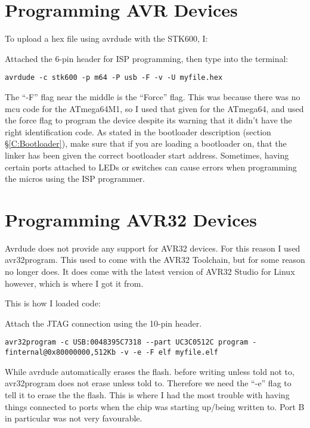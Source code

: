 \documentclass[a4paper, oneside, 11pt, titlepage, onecolumn, openright]{report}
\begin{document}
{{\section{Programming AVR Devices}
			\label{s:STK600AVRDevices}
			To upload a hex file using avrdude with the STK600, I:\newline
			
			Attached the 6-pin header for ISP programming, then type into the terminal:
			
\begin{lstlisting}[frame=trBL, breaklines=true]
 avrdude -c stk600 -p m64 -P usb -F -v -U myfile.hex 
\end{lstlisting}

			The ``-F'' flag near the middle is the ``Force'' flag. This was because there was no mcu code for the ATmega64M1, so I used that given for the ATmega64, and used the force flag to program the device despite its warning that it didn't have the right identification code. \newline
			As stated in the bootloader description (section \S\ref{C:Bootloader}), make sure that if you are loading a bootloader on, that the linker has been given the correct bootloader start address.\newline
			Sometimes, having certain ports attached to LEDs or switches can cause errors when programming the micros using the ISP programmer.
			
			
\section{Programming AVR32 Devices}
			\label{s:STK600AVR32Devices}
			Avrdude does not provide any support for AVR32 devices. For this reason I used avr32program. This used to come with the AVR32 Toolchain, but for some reason no longer does. It does come with the latest version of AVR32 Studio for Linux however, which is where I got it from.

			This is how I loaded code:\newline
			
			Attach the JTAG connection using the 10-pin header.
 						
\begin{lstlisting}[frame=trBL, breaklines=true]
avr32program -c USB:0048395C7318 --part UC3C0512C program -finternal@0x80000000,512Kb -v -e -F elf myfile.elf
\end{lstlisting}			
			 
			 While avrdude automatically erases the flash. before writing unless told not to, avr32program does not erase unless told to. Therefore we need the ``-e'' flag to tell it to erase the the flash.\newline
			 This is where I had the most trouble with having things connected to ports when the chip was starting up/being written to. Port B in particular was not very favourable.


}}
\end{document}
